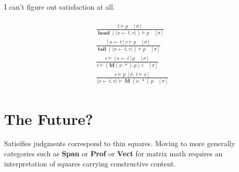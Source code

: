 \documentclass[twocolumn]{scrartcl}
\DeclareMathOperator{\prop}{*}
\DeclareMathOperator{\head}{\textbf{head}}
\DeclareMathOperator{\tail}{\textbf{tail}}
\DeclareMathOperator{\Mu}{\textbf{M}}
\DeclareMathOperator{\update}{\leftarrow}
\begin{document}
I can't figure out satisfaction at all.

\begin{multline*}
  \\
\frac{
  t \models p \quad [\sigma]
}{
  \head(\langle x \update t , v \rangle) \models p \quad [\sigma]
}\\
\frac{
  [x \update t] v \models p \quad [\sigma]
}{
  \tail(\langle x \update t , v \rangle) \models p \quad [\sigma]
}\\
\frac{
  v \models [x \update t] p \quad [\sigma]
}{
  v \models ( \textbf{M} (x \colon \prop). p) \, t \quad [\sigma]
}\\
\frac{
  v \models p \; [ \sigma , \, t \models x]
}{
  \langle x \update t , v \rangle \models \Mu (x \colon \prop). p \quad [\sigma]
}\\
\end{multline*}

\section*{The Future?}

Satisifies judgments correspond to thin squares. Moving to more
generally categories such as \textbf{Span} or \textbf{Prof} or
\textbf{Vect} for matrix math requires an interpretation of squares
carrying constructive content.
\end{document}
